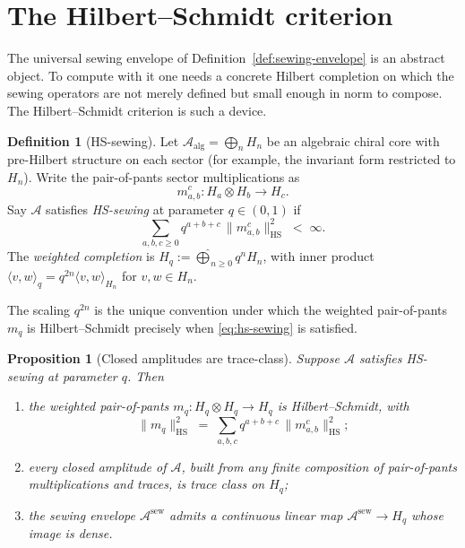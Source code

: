 \documentclass[11pt,reqno]{amsart}
\newtheorem{proposition}[theorem]{Proposition}
\theoremstyle{definition}
\newtheorem{definition}[theorem]{Definition}
\theoremstyle{remark}
\newcommand{\cA}{\mathcal{A}}
\newcommand{\HS}{\mathrm{HS}}
\numberwithin{equation}{section}
\begin{document}

\section{The Hilbert--Schmidt criterion}\label{sec:hs-criterion}

The universal sewing envelope of
Definition~\ref{def:sewing-envelope} is an abstract object. To
compute with it one needs a concrete Hilbert completion on which
the sewing operators are not merely defined but small enough in
norm to compose. The Hilbert--Schmidt criterion is such a device.

\begin{definition}[HS-sewing]\label{def:hs-sewing}
Let $\cA_{\mathrm{alg}} = \bigoplus_n H_n$ be an algebraic chiral
core with pre-Hilbert structure on each sector (for example, the
invariant form restricted to $H_n$). Write the pair-of-pants
sector multiplications as
\[
m_{a,b}^c \colon H_a \otimes H_b \longrightarrow H_c.
\]
Say $\cA$ satisfies \emph{HS-sewing} at parameter $q \in (0,1)$ if
\begin{equation}\label{eq:hs-sewing}
\sum_{a,b,c \geq 0} q^{a+b+c}\,
\|m_{a,b}^c\|_{\HS}^2
\;<\; \infty.
\end{equation}
The \emph{weighted completion} is
$H_q := \widehat{\bigoplus}_{n \geq 0} q^n H_n$, with inner
product $\langle v, w \rangle_q = q^{2n}\langle v, w\rangle_{H_n}$
for $v, w \in H_n$.
\end{definition}

The scaling $q^{2n}$ is the unique convention under which the
weighted pair-of-pants $m_q$ is Hilbert--Schmidt precisely when
\eqref{eq:hs-sewing} is satisfied.

\begin{proposition}[Closed amplitudes are trace-class]
\label{prop:closed-trace-class}
Suppose $\cA$ satisfies HS-sewing at parameter $q$. Then
\begin{enumerate}[label=\textup{(\roman*)}]
\item the weighted pair-of-pants
$m_q \colon H_q \otimes H_q \to H_q$ is Hilbert--Schmidt, with
\[
\|m_q\|_{\HS}^2
\;=\;
\sum_{a,b,c} q^{a+b+c}\, \|m_{a,b}^c\|_{\HS}^2;
\]
\item every closed amplitude of $\cA$, built from any finite
composition of pair-of-pants multiplications and traces, is trace
class on $H_q$;
\item the sewing envelope $\cA^{\mathrm{sew}}$ admits a continuous
linear map $\cA^{\mathrm{sew}} \to H_q$ whose image is dense.
\end{enumerate}
\end{proposition}
\end{document}
